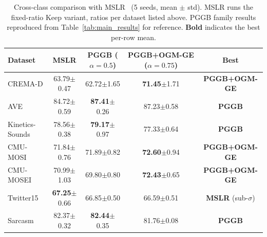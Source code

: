 \documentclass{article} %
\begin{document}
\begin{table}[H]
\centering
\caption{Cross-class comparison with MSLR~\citep{yao2022mslr} (5 seeds, mean $\pm$ std). MSLR runs the fixed-ratio Keep variant, ratios per dataset listed above. PGGB family results reproduced from Table~\ref{tab:main_results} for reference. \textbf{Bold} indicates the best per-row mean.}
\label{tab:mslr_comparison}
\vspace{0.3em}
\footnotesize
\begin{tabular}{lcccc}
\toprule
\textbf{Dataset} & MSLR & PGGB ($\alpha{=}0.5$) & PGGB+OGM-GE ($\alpha{=}0.75$) & Best \\
\midrule
CREMA-D    & 63.79{\scriptsize$\pm$0.47} & 62.72{\scriptsize$\pm$1.65} & \textbf{71.45}{\scriptsize$\pm$1.71} & \textbf{PGGB+OGM-GE} \\
AVE        & 84.72{\scriptsize$\pm$0.59} & \textbf{87.41}{\scriptsize$\pm$0.26} & 87.23{\scriptsize$\pm$0.58} & \textbf{PGGB} \\
Kinetics-Sounds & 78.56{\scriptsize$\pm$0.38} & \textbf{79.17}{\scriptsize$\pm$0.97} & 77.33{\scriptsize$\pm$0.64} & \textbf{PGGB} \\
CMU-MOSI   & 71.84{\scriptsize$\pm$0.76} & 71.89{\scriptsize$\pm$0.82} & \textbf{72.60}{\scriptsize$\pm$0.94} & \textbf{PGGB+OGM-GE} \\
CMU-MOSEI  & 70.99{\scriptsize$\pm$1.03} & 69.80{\scriptsize$\pm$0.80} & \textbf{72.43}{\scriptsize$\pm$0.65} & \textbf{PGGB+OGM-GE} \\
Twitter15  & \textbf{67.25}{\scriptsize$\pm$0.66} & 66.85{\scriptsize$\pm$0.50} & 66.59{\scriptsize$\pm$0.51} & \textbf{MSLR} (sub-$\sigma$) \\
Sarcasm    & 82.37{\scriptsize$\pm$0.32} & \textbf{82.44}{\scriptsize$\pm$0.35} & 81.76{\scriptsize$\pm$0.08} & \textbf{PGGB} \\
\bottomrule
\end{tabular}
\end{table}

\end{document}

